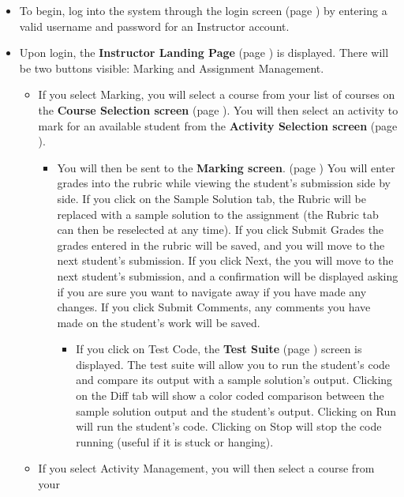 \documentclass{article}
\begin{document}
\begin{itemize}
  \item To begin, log into the system through the login screen (page \pageref{login})
    by entering a valid username and password for an Instructor account.
  \item Upon login, the \textbf{Instructor Landing Page} (page \pageref{landPg}) 
    is displayed. There will be two buttons visible: Marking and Assignment 
    Management.
    \begin{itemize}
      \item If you select Marking, you will select a course from your list of courses
        on the \textbf{Course Selection screen} (page \pageref{courseSel}). You will then select an activity
        to mark for an available student from the \textbf{Activity Selection screen}
        (page \pageref{actSel}).
        \begin{itemize}
        \item You will then be sent to the \textbf{Marking screen}. (page
	  \pageref{marking}) You will enter grades into the rubric while viewing 
	  the student's submission side by side. If you click on the Sample Solution 
	  tab, the Rubric will be replaced with a sample solution to the assignment 
	  (the Rubric tab can then be reselected at any time). If you click Submit 
	  Grades the grades entered in the rubric will be saved, and you will 
	  move to the next student's submission. If you click Next, the you will 
	  move to the next student's submission, and a confirmation will be displayed 
	  asking if you are sure you want to navigate away if you have made any 
	  changes. If you click Submit Comments, any comments you have made 
	  on the student's work will be saved.
	  \begin{itemize}
	    \item If you click on Test Code, the \textbf{Test Suite} (page 
	      \pageref{testSuite}) screen is displayed. The test suite will allow you 
	      to run the student's code and compare its output with a sample 
	      solution's output. Clicking on the Diff tab will show a color coded 
	      comparison between the sample solution output and the student's 
	      output. Clicking on Run will run the student's code. Clicking on Stop 
	      will stop the code running (useful if it is stuck or hanging).
	  \end{itemize}
	\end{itemize}
      \item If you select Activity Management, you will then select a course from your

\end{itemize}
\end{itemize}
\end{document}
